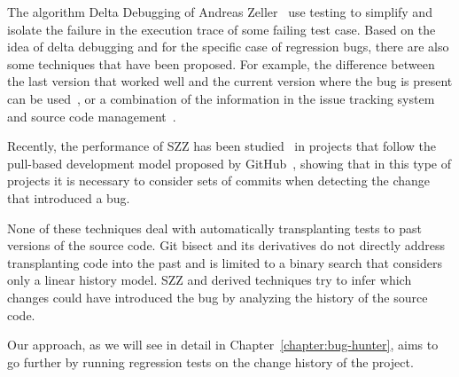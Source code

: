 The algorithm Delta Debugging of Andreas Zeller~\cite{zeller2002simplifying,zeller2002isolating} use testing to simplify and isolate the failure in the execution trace of some failing test case.
Based on the idea of delta debugging and for the specific case of regression bugs, there are also some techniques that have been proposed. 
For example, the difference between the last version that worked well and the current version where the bug is present can be used~\cite{saha2017selective}, or a combination of the information in the issue tracking system and source code management~\cite{khattar2015sarathi}.

Recently, the performance of SZZ has been studied~\cite{bludau2022pr,petrulio2022szz} in projects that follow the pull-based development
model proposed by GitHub~\cite{gousios2014exploratory}, showing that in this type of projects it is necessary to consider sets of commits when detecting the change that introduced a bug.

None of these techniques deal with automatically transplanting tests to past versions of the source code. 
Git bisect and its derivatives do not directly address transplanting code into the past and is limited to a binary search that considers only a linear history model.
SZZ and derived techniques try to infer which changes could have introduced the bug by analyzing the history of the source code.

Our approach, as we will see in detail in Chapter~\ref{chapter:bug-hunter}, aims to go further by running regression tests on the change history of the project.